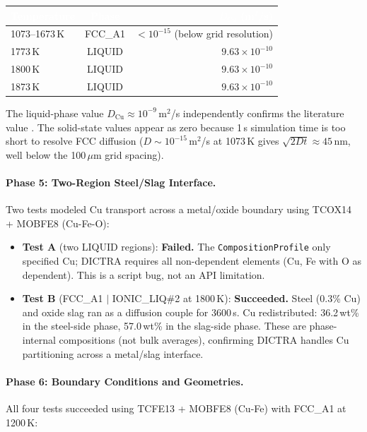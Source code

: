 \documentclass[11pt]{article}
\begin{document}
\begin{center}
\begin{tabular}{l c r}
\hline
\rowcolor{headercolor}
\textcolor{white}{\textbf{Temperature}} & \textcolor{white}{\textbf{Phase}} & \textcolor{white}{\textbf{$D_{\text{Cu}}$ (m$^2$/s)}} \\
\hline
1073--1673\,K & FCC\_A1 & $<10^{-15}$ (below grid resolution) \\
\rowcolor{altrow}
1773\,K & LIQUID & $9.63 \times 10^{-10}$ \\
1800\,K & LIQUID & $9.63 \times 10^{-10}$ \\
\rowcolor{altrow}
1873\,K & LIQUID & $9.63 \times 10^{-10}$ \\
\hline
\end{tabular}
\end{center}

The liquid-phase value $D_{\text{Cu}} \approx 10^{-9}$\,m$^2$/s independently confirms the literature value \cite{Hino2010}. The solid-state values appear as zero because 1\,s simulation time is too short to resolve FCC diffusion ($D \sim 10^{-15}$\,m$^2$/s at 1073\,K gives $\sqrt{2Dt} \approx 45$\,nm, well below the 100\,$\mu$m grid spacing).

\paragraph{Phase 5: Two-Region Steel/Slag Interface.}
Two tests modeled Cu transport across a metal/oxide boundary using TCOX14 + MOBFE8 (Cu-Fe-O):

\begin{itemize}[leftmargin=*]
    \item \textbf{Test A} (two LIQUID regions): \textbf{Failed.} The \texttt{CompositionProfile} only specified Cu; DICTRA requires all non-dependent elements (Cu, Fe with O as dependent). This is a script bug, not an API limitation.
    \item \textbf{Test B} (FCC\_A1 $|$ IONIC\_LIQ\#2 at 1800\,K): \textbf{Succeeded.} Steel (0.3\% Cu) and oxide slag ran as a diffusion couple for 3600\,s. Cu redistributed: 36.2\,wt\% in the steel-side phase, 57.0\,wt\% in the slag-side phase. These are phase-internal compositions (not bulk averages), confirming DICTRA handles Cu partitioning across a metal/slag interface.
\end{itemize}

\paragraph{Phase 6: Boundary Conditions and Geometries.}
All four tests succeeded using TCFE13 + MOBFE8 (Cu-Fe) with FCC\_A1 at 1200\,K:
\end{document}
